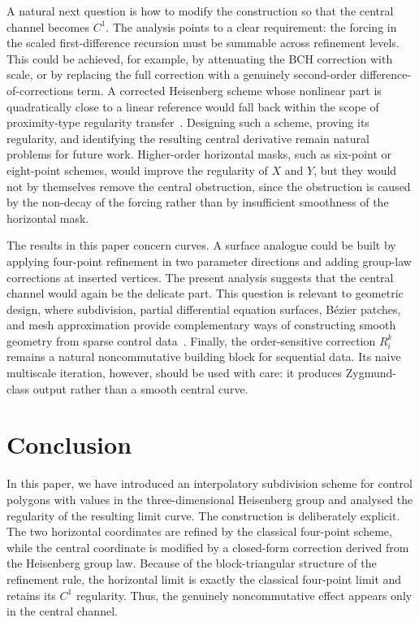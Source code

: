 \documentclass{article}
\theoremstyle{plain}
\theoremstyle{definition}
\begin{document}
A natural next question is how to modify the construction so that the central
channel becomes $C^1$. The analysis points to a clear requirement: the forcing
in the scaled first-difference recursion must be summable across refinement
levels. This could be achieved, for example, by attenuating the BCH correction
with scale, or by replacing the full correction with a genuinely second-order
difference-of-corrections term. A corrected Heisenberg scheme whose nonlinear
part is quadratically close to a linear reference would fall back within the
scope of proximity-type regularity transfer~\cite{Grohs10prox, GrohsWallner09,
DynSharon17a, HuningWallner19}. Designing such a scheme, proving its
regularity, and identifying the resulting central derivative remain natural
problems for future work. Higher-order horizontal masks, such as six-point or
eight-point schemes, would improve the regularity of $X$ and $Y$, but they
would not by themselves remove the central obstruction, since the obstruction is
caused by the non-decay of the forcing rather than by insufficient smoothness of
the horizontal mask.

The results in this paper concern curves. A surface analogue could be built by
applying four-point refinement in two parameter directions and adding group-law
corrections at inserted vertices. The present analysis suggests that the
central channel would again be the delicate part. This question is relevant to
geometric design, where subdivision, partial differential equation surfaces,
B\'ezier patches, and mesh approximation provide complementary ways of
constructing smooth geometry from sparse control data~\cite{BloorWilson89,
UgailBW99a, KubiesaUW04, MonterdeUgail06, GonzalezUgail08, ShengUgail10}.
Finally, the order-sensitive correction $R_i^k$ remains a natural
noncommutative building block for sequential data. Its naive multiscale
iteration, however, should be used with care: it produces Zygmund-class output
rather than a smooth central curve.

\section{Conclusion}\label{sec:conclusion}

In this paper, we have introduced an interpolatory subdivision scheme for control polygons
with values in the three-dimensional Heisenberg group and analysed the
regularity of the resulting limit curve. The construction is deliberately
explicit. The two horizontal coordinates are refined by the classical four-point
scheme, while the central coordinate is modified by a closed-form correction
derived from the Heisenberg group law. Because of the block-triangular structure
of the refinement rule, the horizontal limit is exactly the classical
four-point limit and retains its $C^1$ regularity. Thus, the genuinely
noncommutative effect appears only in the central channel.
\end{document}
